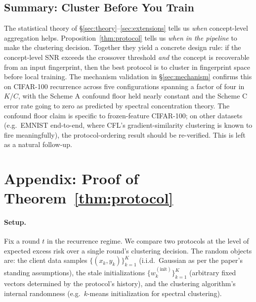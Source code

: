 \subsection{Summary: Cluster Before You Train}
\label{sec:summary_protocol}

The statistical theory of \S\ref{sec:theory}--\ref{sec:extensions} tells us \emph{when} concept-level aggregation helps. Proposition~\ref{thm:protocol} tells us \emph{when in the pipeline} to make the clustering decision. Together they yield a concrete design rule: if the concept-level SNR exceeds the crossover threshold \emph{and} the concept is recoverable from an input fingerprint, then the best protocol is to cluster in fingerprint space before local training. The mechanism validation in \S\ref{sec:mechanism} confirms this on CIFAR-100 recurrence across five configurations spanning a factor of four in $K/C$, with the Scheme A confound floor held nearly constant and the Scheme C error rate going to zero as predicted by spectral concentration theory. The confound floor claim is specific to frozen-feature CIFAR-100; on other datasets (e.g.\ EMNIST end-to-end, where CFL's gradient-similarity clustering is known to fire meaningfully), the protocol-ordering result should be re-verified. This is left as a natural follow-up.

\section*{Appendix: Proof of Theorem~\ref{thm:protocol}}
\label{app:protocol_proof}

\paragraph{Setup.}
Fix a round $t$ in the recurrence regime. We compare two protocols at the level of expected excess risk over a single round's clustering decision. The random objects are: the client data samples $\{(x_k, y_k)\}_{k=1}^K$ (i.i.d.\ Gaussian as per the paper's standing assumptions), the stale initializations $\{w_k^{(\mathrm{init})}\}_{k=1}^K$ (arbitrary fixed vectors determined by the protocol's history), and the clustering algorithm's internal randomness (e.g.\ $k$-means initialization for spectral clustering).

